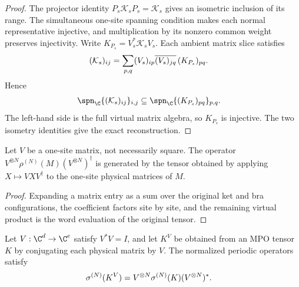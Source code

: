 \begin{proof}\leanok
    The projector identity $P_s\mathcal K_sP_s=\mathcal K_s$ gives an
    isometric inclusion of its range. The simultaneous one-site spanning
    condition makes each normal representative injective, and multiplication
    by its nonzero common weight preserves injectivity. Write
    $K_{P_s}=V_s^*\mathcal K_sV_s$. Each ambient matrix slice satisfies
    \begin{align}
        (\mathcal K_s)_{ij}
         & =\sum_{p,q}(V_s)_{ip}
        \overline{(V_s)_{jq}}\,(K_{P_s})_{pq}.
        \notag
    \end{align}
    Hence
    \begin{align}
        \spn_{\C}\{(\mathcal K_s)_{ij}\}_{i,j}
         & \subseteq
        \spn_{\C}\{(K_{P_s})_{pq}\}_{p,q}.
        \notag
    \end{align}
    The left-hand side is the full virtual matrix algebra, so $K_{P_s}$ is
    injective. The two isometry identities give the exact reconstruction.
\end{proof}

\begin{lemma}%
    \label{lem:mpdo_sitewise_physical_coordinate_congruence}
    \leanok
    Let $V$ be a one-site matrix, not necessarily square. The operator
    $V^{\otimes N}\rho^{(N)}(M)(V^{\otimes N})^\dagger$ is generated by
    the tensor obtained by applying $X\mapsto VXV^\dagger$ to the
    one-site physical matrices of $M$.
\end{lemma}
\begin{proof}\leanok
    Expanding a matrix entry as a sum over the original ket and bra
    configurations, the coefficient factors site by site, and the remaining
    virtual product is the word evaluation of the original tensor.
\end{proof}

\begin{lemma}
    \label{thm:mpdo_normalized_state_physical_isometry_transport}
    \leanok
    Let $V:\C^d\to\C^e$ satisfy $V^*V=I$, and let $K^V$ be obtained from an MPO
    tensor $K$ by conjugating each physical matrix by $V$.  The normalized
    periodic operators satisfy
    \begin{align}
        \sigma^{(N)}(K^V)
         & =V^{\otimes N}\sigma^{(N)}(K)(V^{\otimes N})^*.
        \notag
    \end{align}
\end{lemma}

